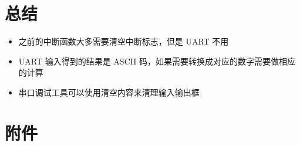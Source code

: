 \documentclass[a4paper,10pt,UTF8]{paper}
\numberwithin{equation}{section}
\numberwithin{figure}{section}
\begin{document}
\section{总结}
    
\begin{itemize}
    \item 之前的中断函数大多需要清空中断标志，但是 UART 不用
    \item UART 输入得到的结果是 ASCII 码，如果需要转换成对应的数字需要做相应的计算
    \item 串口调试工具可以使用清空内容来清理输入输出框
\end{itemize}
  
\section{附件}
\end{document}
